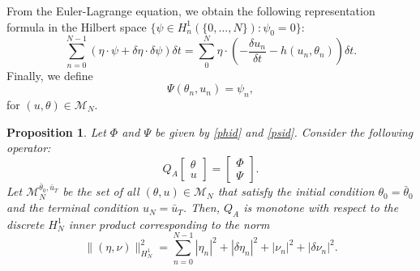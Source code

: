 \documentclass[12pt]{amsart}
\newcommand{\1}{{\chi}}
\newcommand{\Mm}{{\mathcal{M}}}
\newcommand{\lb}{\left(}
\newcommand{\rb}{\right)}
\newtheorem{pro}{Proposition}
\theoremstyle{definition}
\begin{document}
          From the Euler-Lagrange equation, we obtain the following representation formula in the Hilbert space $\{\psi \in H_n^1(\{0,\ldots,N\}): \psi_0 = 0\}$:  
          \begin{equation*}
                \sum_{n=0}^{N-1} \lb \eta \cdot \psi + \delta \eta  \cdot \delta \psi \rb \delta t =  \sum_{0}^N \eta \cdot \lb - \frac{\delta u_n}{\delta t}-h(u_n,\theta_n)  \rb \delta t.
          \end{equation*}
     Finally, we define
          \begin{equation}
          \label{psid}
                \Psi(\theta_n,u_n) = \psi_n,
          \end{equation}
          for $(u,\theta)\in \mathcal{M}_N$.
        \begin{pro} \label{prop:monot}
                Let $\Phi$ and $\Psi$ be given by \eqref{phid} and \eqref{psid}. Consider the following operator:
        \begin{equation}
        \label{qaop}
                Q_A\left[\begin{array}{c}
            \theta\\
            u   
            \end{array}\right]
                                =
                                \left[\begin{array}{c}
                                \Phi\\
                                \Psi
                                \end{array}\right].
        \end{equation}
           Let $\Mm_N^{\bar \theta_0,\bar u_T}$ be the set of all
             $(\theta, u) \in \Mm_N$ that satisfy the initial condition $\theta_0=\bar \theta_0$ and the terminal condition $u_N=\bar u_T$.      
                Then, $Q_A$ is monotone with respect to the discrete $H^1_N$ inner product corresponding to the norm
                \begin{equation}
                \label{h1nn}
                        \|(\eta, \nu )\|_{H^1_N}^2 = \sum_{n=0}^{N-1} |\eta_n|^2 + |\delta \eta_n|^2 + |\nu_n|^2 + |\delta \nu_n|^2.
                \end{equation}
        \end{pro}               
                                 
\end{document}
